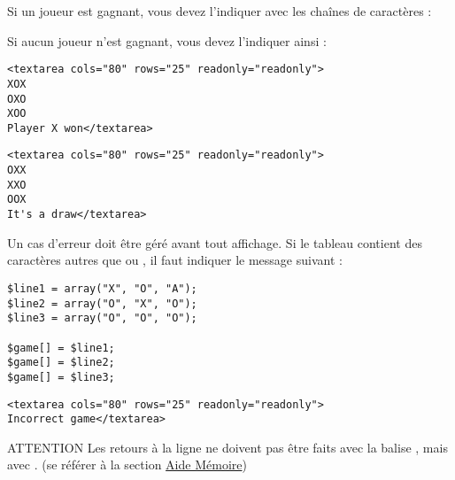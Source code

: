 \noindent Si un joueur est gagnant, vous devez l'indiquer avec les chaînes de caractères :

\bigskip

\noindent {}

\noindent {}

\bigskip

\noindent Si aucun joueur n'est gagnant, vous devez l'indiquer ainsi :

\bigskip

\noindent {}

\bigskip

\lstset{language=php}
\begin{lstlisting}[frame=single,title={Cas général gagnant}]
<textarea cols="80" rows="25" readonly="readonly">
XOX
OXO
XOO
Player X won</textarea>
\end{lstlisting}

\lstset{language=php}
\begin{lstlisting}[frame=single,title={Cas général en match nul}]
<textarea cols="80" rows="25" readonly="readonly">
OXX
XXO
OOX
It's a draw</textarea>
\end{lstlisting}

\bigskip

\noindent Un cas d'erreur doit être géré avant tout affichage.
Si le tableau contient des caractères autres que  ou , il faut indiquer le message suivant :

\bigskip

\noindent {}

\bigskip

\lstset{language=php}
\begin{lstlisting}[frame=single,title={Exemple de tableau de jeu incorrect (exo4\_data.php)}]
$line1 = array("X", "O", "A");
$line2 = array("O", "X", "O");
$line3 = array("O", "O", "O");

$game[] = $line1;
$game[] = $line2;
$game[] = $line3;
\end{lstlisting}

\lstset{language=php}
\begin{lstlisting}[frame=single,title={Cas d'erreur}]
<textarea cols="80" rows="25" readonly="readonly">
Incorrect game</textarea>
\end{lstlisting}

\bigskip

\begin{RedBoxTitle}{ATTENTION}
    Les retours à la ligne ne doivent pas être faits avec la balise , mais avec .
    (se référer à la section \hyperref[sec:AideMemoire]{Aide Mémoire})
\end{RedBoxTitle}
